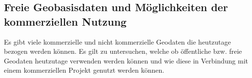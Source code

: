 \subsection*{Freie Geobasisdaten und Möglichkeiten der kommerziellen Nutzung}

Es gibt viele kommerzielle und nicht kommerzielle Geodaten die heutzutage bezogen werden können. Es gilt zu untersuchen, welche ob öffentliche bzw. freie Geodaten heutzutage verwenden werden können und wie diese in Verbindung mit einem kommerziellen Projekt genutzt werden können.